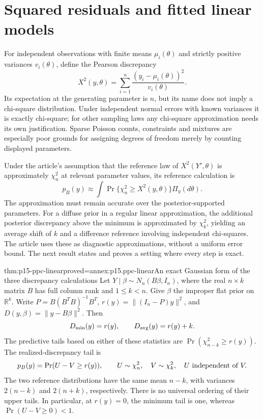 \section{Squared residuals and fitted linear models}
\label{sec:p15-ppc-linear}

For independent observations with finite means \(\mu_i(\theta)\) and
strictly positive variances \(v_i(\theta)\), define the Pearson discrepancy
\[
 X^2(y,\theta)=\sum_{i=1}^n
       \frac{(y_i-\mu_i(\theta))^2}{v_i(\theta)}.
\]
Its expectation at the generating parameter is \(n\), but its name does
not imply a chi-square distribution. Under independent normal errors with
known variances it is exactly chi-square; for other sampling laws any
chi-square approximation needs its own justification. Sparse Poisson counts,
constraints and mixtures are especially poor grounds for assigning degrees
of freedom merely by counting displayed parameters.

Under the article's assumption that the reference law of
\(X^2(Y',\theta)\) is approximately \(\chi^2_n\) at relevant
parameter values, its reference calculation is
\[
 p_B(y)\approx\int\Pr\{\chi^2_n\geq X^2(y,\theta)\}\Pi_y(d\theta).
\]
The approximation must remain accurate over the posterior-supported
parameters. For a diffuse prior in a regular linear approximation, the
additional posterior discrepancy above the minimum is approximated by
\(\chi^2_k\), yielding an average shift of \(k\) and a difference
reference involving independent chi-squares. The article uses these as
diagnostic approximations, without a uniform error bound. The next result
states and proves a setting where every step is exact.

\begin{hbtheorem}{thm:p15-ppc-linear}{proved=annex:p15.ppc-linear}{An exact Gaussian form of the three discrepancy calculations}
Let \(Y\mid\beta\sim N_n(B\beta,I_n)\), where the real \(n\times k\)
matrix \(B\) has full column rank and \(1\leq k<n\). Give \(\beta\)
the improper flat prior on \(\mathbb R^k\). Write
\(P=B(B^TB)^{-1}B^T\), \(r(y)=\|(I_n-P)y\|^2\), and
\(D(y,\beta)=\|y-B\beta\|^2\). Then
\[
 D_{\min}(y)=r(y),\qquad D_{\rm avg}(y)=r(y)+k.
\]
The predictive tails based on either of these statistics are
\(\Pr(\chi^2_{n-k}\geq r(y))\). The realized-discrepancy tail is
\[
 p_B(y)=\Pr(U-V\geq r(y)),\qquad
 U\sim\chi^2_n,\quad V\sim\chi^2_k,\quad U\ \hbox{independent of }V.
\]
The two reference distributions have the same mean \(n-k\), with variances
\(2(n-k)\) and \(2(n+k)\), respectively. There is no universal ordering
of their upper tails. In particular, at \(r(y)=0\), the minimum tail is
one, whereas \(\Pr(U-V\geq0)<1\).
\end{hbtheorem}

